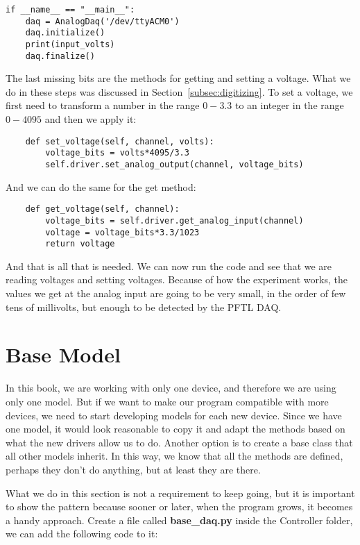 \begin{verbatim}
if __name__ == "__main__":
    daq = AnalogDaq('/dev/ttyACM0')
    daq.initialize()
    print(input_volts)
    daq.finalize()
\end{verbatim}

The last missing bits are the methods for getting and setting a voltage. What we do in these steps was discussed in Section~\ref{subsec:digitizing}. To set a voltage, we first need to transform a number in the range $0-3.3$ to an integer in the range $0-4095$ and then we apply it:

\begin{verbatim}
    def set_voltage(self, channel, volts):
        voltage_bits = volts*4095/3.3
        self.driver.set_analog_output(channel, voltage_bits)
\end{verbatim}

And we can do the same for the get method:

\begin{verbatim}
    def get_voltage(self, channel):
        voltage_bits = self.driver.get_analog_input(channel)
        voltage = voltage_bits*3.3/1023
        return voltage
\end{verbatim}

And that is all that is needed. We can now run the code and see that we are reading voltages and setting voltages. Because of how the experiment works, the values we get at the analog input are going to be very small, in the order of few tens of millivolts, but enough to be detected by the {PFTL DAQ}.

\section{Base Model}\label{sec:base-model}
In this book, we are working with only one device, and therefore we are using only one model. But if we want to make our program compatible with more devices, we need to start developing models for each new device. Since we have one model, it would look reasonable to copy it and adapt the methods based on what the new drivers allow us to do. Another option is to create a base class that all other models inherit. In this way, we know that all the methods are defined, perhaps they don't do anything, but at least they are there.

What we do in this section is not a requirement to keep going, but it is important to show the pattern because sooner or later, when the program grows, it becomes a handy approach. Create a file called \textbf{base\_daq.py} inside the Controller folder, we can add the following code to it:

